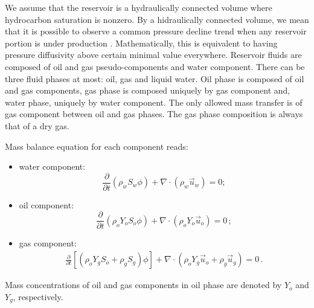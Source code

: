 \documentclass[final,authoryear,5p,twocolumn,10pt]{elsarticle}
\begin{document}

We assume that the reservoir is a hydraulically connected volume where hydrocarbon saturation is nonzero. By a hidraulically connected volume, we mean that it is possible to observe a common pressure decline trend when any reservoir portion is under production \citep{dakepractice}. Mathematically, this is equivalent to having pressure diffusivity above certain minimal value everywhere. Reservoir fluids are composed of oil and gas pseudo-components and water component. There can be three fluid phases at most: oil, gas and liquid water. Oil phase is composed of oil and gas components, gas phase is composed uniquely by gas component and, water phase, uniquely by water component. The only allowed mass transfer is of gas component between oil and gas phases. The gas phase composition is always that of a dry gas.


Mass balance equation for each component reads:

\begin{itemize}
\item water component:
\begin{equation}\label{eq: Sw1}
\frac{\partial}{\partial t} \left( \rho_w S_w \phi \right) +\nabla \cdot \left( \rho_w \vec{u}_w \right) = 0 ;
\end{equation}

\item oil component:
\begin{equation}\label{eq: So1}
\frac{\partial}{\partial t}\left( \rho_o Y_o S_o \phi \right) + \nabla \cdot \left( \rho_o Y_o \vec{u}_o \right) = 0 \, ;
\end{equation}

\item gas component:
\begin{equation}\label{eq: Sg1}
\begin{split}
\frac{\partial}{\partial t} \left[\left( \rho_o Y_g S_o + \rho_g S_g\right)\phi \right] + \nabla  \cdot \left( \rho_o Y_g \vec{u}_o + \rho_g \vec{u}_g\right) = 0\, .
\end{split}
\end{equation}
\end{itemize}
Mass concentrations of oil and gas components in oil phase are denoted by $Y_o$ and $Y_g$, respectively. 
\end{document}
